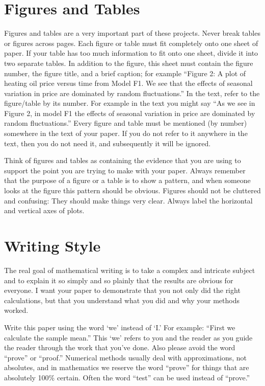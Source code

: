 \section{Figures and Tables}
Figures and tables are a very important part of these projects. Never break tables or
figures across pages. Each figure or table must fit completely onto one sheet of paper. If
your table has too much information to fit onto one sheet, divide it into two separate
tables. In addition to the figure, this sheet must contain the figure number, the figure
title, and a brief caption; for example ``Figure 2: A plot of heating oil price versus time
from Model F1. We see that the effects of seasonal variation in price are dominated by
random fluctuations.'' In the text, refer to the figure/table by its number. For example in
the text you might say ``As we see in Figure 2, in model F1 the effects of seasonal 
variation in price are dominated by random fluctuations.'' Every figure and table must be
mentioned (by number) somewhere in the text of your paper. If you do not refer to it
anywhere in the text, then you do not need it, and subsequently it will be ignored.

Think of figures and tables as containing the evidence that you are using to support the
point you are trying to make with your paper. Always remember that the purpose of a figure
or a table is to show a pattern, and when someone looks at the figure this pattern should
be obvious. Figures should not be cluttered and confusing: They should make things very
clear. Always label the horizontal and vertical axes of plots.

\section{Writing Style}
The real goal of mathematical writing is to take a complex and intricate subject and to
explain it so simply and so plainly that the results are obvious for everyone. I want your
paper to demonstrate that you not only did the right calculations, but that you understand
what you did and why your methods worked.

Write this paper using the word `we' instead of `I.' For example: ``First we calculate the
sample mean.'' This `we' refers to you and the reader as you guide the reader through the
work that you've done. Also please avoid the word ``prove'' or ``proof.'' Numerical methods
usually deal with approximations, not absolutes, and in mathematics we reserve the word
``prove'' for things that are absolutely 100\% certain. Often the word ``test'' can be used
instead of ``prove.''




